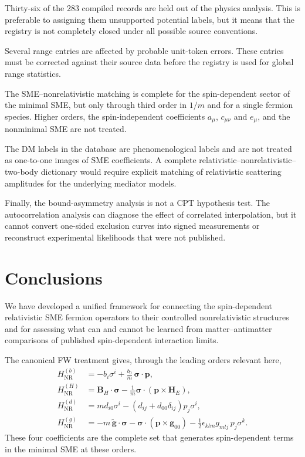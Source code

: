 \documentclass[aps,prd,reprint,superscriptaddress,nofootinbib]{revtex4-2}
\newcommand{\NR}{\mathrm{NR}}
\begin{document}
	Thirty-six of the 283 compiled records are held out of the physics analysis. This is preferable to assigning them unsupported potential
	labels, but it means that the registry is not completely closed under
	all possible source conventions.
	
	Several range entries are affected by probable unit-token errors. These
	entries must be corrected against their source data before the registry
	is used for global range statistics.
	
	The SME--nonrelativistic matching is complete for the spin-dependent
sector of the minimal SME, but only through third order in $1/m$ and for
a single fermion species. Higher orders, the spin-independent
coefficients $a_\mu$, $c_{\mu\nu}$ and $e_\mu$, and the nonminimal SME
are not treated.
	
	The DM labels in the database are phenomenological labels and are not
	treated as one-to-one images of SME coefficients. A complete
	relativistic--nonrelativistic--two-body dictionary would require explicit
	matching of relativistic scattering amplitudes for the underlying
	mediator models.
	
	Finally, the bound-asymmetry analysis is not a CPT hypothesis test.
	The autocorrelation analysis can diagnose the effect of correlated
	interpolation, but it cannot convert one-sided exclusion curves into
	signed measurements or reconstruct experimental likelihoods that were
	not published.
	
	\section{Conclusions}
	
	We have developed a unified framework for connecting the spin-dependent relativistic SME fermion operators to their controlled nonrelativistic structures and for assessing what can and cannot be
	learned from matter--antimatter comparisons of published
	spin-dependent interaction limits.
	
	The canonical FW treatment gives, through the leading orders relevant
	here,
	\begin{align}
		H_{\NR}^{(b)}
		&=
		-b_i\sigma^i
		+\frac{b_0}{m}\,
		\boldsymbol{\sigma}\cdot\mathbf p,
		\label{eq:summaryb}
		\\
		H_{\NR}^{(H)}
		&=
		\mathbf B_H\cdot\boldsymbol{\sigma}
		-\frac{1}{m}
		\boldsymbol{\sigma}\cdot
		(\mathbf p\times\mathbf H_E),
		\label{eq:summaryH}
		\\
		H_{\NR}^{(d)}
		&=
		m d_{i0}\sigma^i
		-
		(d_{ij}+d_{00}\delta_{ij})p_j\sigma^i ,
		\label{eq:summaryd}
		\\
		H_{\NR}^{(g)}
		&=
		-m\,\tilde{\mathbf g}\cdot\boldsymbol{\sigma}
		-\boldsymbol{\sigma}\cdot(\mathbf p\times\mathbf g_{00})
		-\tfrac12\epsilon_{klm}g_{mlj}\,p_j\sigma^k .
		\label{eq:summaryg}
	\end{align}
	These four coefficients are the complete set that generates
	spin-dependent terms in the minimal SME at these orders.
	
\end{document}
